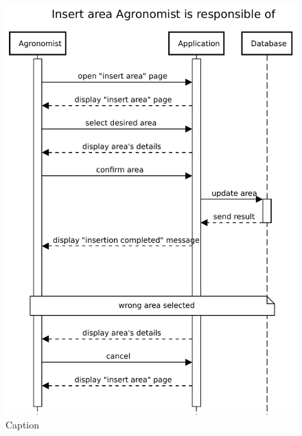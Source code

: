 \begin{figure}[H]
    \centering
    \includegraphics[scale=0.75]{Images/Sequence diagrams/Agronomist - Insert area.pdf}
    \caption{Caption}
    \label{fig:fig:seq_diag_insert_area}
\end{figure}



